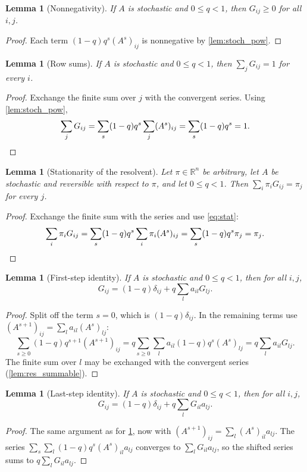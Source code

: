 \documentclass[11pt]{article}
\newtheorem{lemma}[theorem]{Lemma}
\theoremstyle{definition}
\theoremstyle{remark}
\newcommand{\R}{\mathbb{R}}
\begin{document}
\begin{lemma}[Nonnegativity]\label{lem:res_nonneg}
If $A$ is stochastic and $0\le q<1$, then $G_{ij}\ge0$ for all $i,j$.
\end{lemma}
\begin{proof}
Each term $(1-q)q^s(A^s)_{ij}$ is nonnegative by \cref{lem:stoch_pow}.
\end{proof}

\begin{lemma}[Row sums]\label{lem:res_rowsum}
If $A$ is stochastic and $0\le q<1$, then $\sum_jG_{ij}=1$ for every $i$.
\end{lemma}
\begin{proof}
Exchange the finite sum over $j$ with the convergent series. Using \cref{lem:stoch_pow},
\[
\sum_jG_{ij}=\sum_s(1-q)q^s\sum_j(A^s)_{ij}=\sum_s(1-q)q^s=1. \qedhere
\]
\end{proof}

\begin{lemma}[Stationarity of the resolvent]\label{lem:res_stationary}
Let $\pi\in\R^n$ be arbitrary, let $A$ be stochastic and reversible with respect to $\pi$, and let $0\le q<1$. Then $\sum_i\pi_iG_{ij}=\pi_j$ for every $j$.
\end{lemma}
\begin{proof}
Exchange the finite sum with the series and use \eqref{eq:stat}:
\[
\sum_i\pi_iG_{ij}=\sum_s(1-q)q^s\sum_i\pi_i(A^s)_{ij}=\sum_s(1-q)q^s\pi_j=\pi_j. \qedhere
\]
\end{proof}

\begin{lemma}[First-step identity]\label{lem:res_left}
If $A$ is stochastic and $0\le q<1$, then for all $i,j$,
\[
G_{ij}=(1-q)\delta_{ij}+q\sum_la_{il}G_{lj}.
\]
\end{lemma}
\begin{proof}
Split off the term $s=0$, which is $(1-q)\delta_{ij}$. In the remaining terms use $(A^{s+1})_{ij}=\sum_la_{il}(A^s)_{lj}$:
\[
\sum_{s\ge0}(1-q)q^{s+1}(A^{s+1})_{ij}=q\sum_{s\ge0}\sum_la_{il}(1-q)q^s(A^s)_{lj}=q\sum_la_{il}G_{lj}.
\]
The finite sum over $l$ may be exchanged with the convergent series (\cref{lem:res_summable}).
\end{proof}

\begin{lemma}[Last-step identity]\label{lem:res_right}
If $A$ is stochastic and $0\le q<1$, then for all $i,j$,
\[
G_{ij}=(1-q)\delta_{ij}+q\sum_lG_{il}a_{lj}.
\]
\end{lemma}
\begin{proof}
The same argument as for \cref{lem:res_left}, now with $(A^{s+1})_{ij}=\sum_l(A^s)_{il}a_{lj}$. The series $\sum_s\sum_l(1-q)q^s(A^s)_{il}a_{lj}$ converges to $\sum_lG_{il}a_{lj}$, so the shifted series sums to $q\sum_lG_{il}a_{lj}$.
\end{proof}
\end{document}
